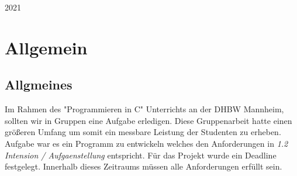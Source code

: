 \documentclass[a4paper, 11pt, oneside]{book} %
\begin{document}
\begin{titlepage}
	\vspace{0.3\baselineskip} 
	
	2021 

\end{titlepage}


\tableofcontents
\newpage

\chapter{Allgemein}

\section{Allgmeines}
Im Rahmen des "Programmieren in C" Unterrichts an der DHBW Mannheim, sollten wir in Gruppen eine Aufgabe erledigen. Diese Gruppenarbeit hatte einen größeren Umfang um somit ein messbare Leistung der Studenten zu erheben. Aufgabe war es ein Programm zu entwickeln welches den Anforderungen in \textit{1.2 Intension / Aufgaenstellung} entspricht. \newline Für das Projekt wurde ein Deadline festgelegt. Innerhalb dieses Zeitraums müssen alle Anforderungen erfüllt sein.
\end{document}
